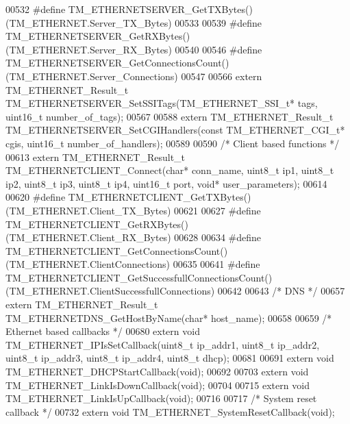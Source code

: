 \begin{DoxyCode}
00532 \textcolor{preprocessor}{#define TM\_ETHERNETSERVER\_GetTXBytes()          (TM\_ETHERNET.Server\_TX\_Bytes)}
00533 
00539 \textcolor{preprocessor}{#define TM\_ETHERNETSERVER\_GetRXBytes()          (TM\_ETHERNET.Server\_RX\_Bytes)}
00540 
00546 \textcolor{preprocessor}{#define TM\_ETHERNETSERVER\_GetConnectionsCount() (TM\_ETHERNET.Server\_Connections)}
00547 
00566 \textcolor{keyword}{extern} TM\_ETHERNET\_Result\_t TM\_ETHERNETSERVER\_SetSSITags(TM\_ETHERNET\_SSI\_t* tags, uint16\_t number\_of\_tags);
00567 
00588 \textcolor{keyword}{extern} TM\_ETHERNET\_Result\_t TM\_ETHERNETSERVER\_SetCGIHandlers(\textcolor{keyword}{const} TM\_ETHERNET\_CGI\_t* cgis, uint16\_t 
      number\_of\_handlers);
00589 
00590 \textcolor{comment}{/* Client based functions */}
00613 \textcolor{keyword}{extern} TM\_ETHERNET\_Result\_t TM\_ETHERNETCLIENT\_Connect(\textcolor{keywordtype}{char}* conn\_name, uint8\_t ip1, uint8\_t ip2, uint8\_t 
      ip3, uint8\_t ip4, uint16\_t port, \textcolor{keywordtype}{void}* user\_parameters);
00614 
00620 \textcolor{preprocessor}{#define TM\_ETHERNETCLIENT\_GetTXBytes()                      (TM\_ETHERNET.Client\_TX\_Bytes)}
00621 
00627 \textcolor{preprocessor}{#define TM\_ETHERNETCLIENT\_GetRXBytes()                      (TM\_ETHERNET.Client\_RX\_Bytes)}
00628 
00634 \textcolor{preprocessor}{#define TM\_ETHERNETCLIENT\_GetConnectionsCount()             (TM\_ETHERNET.ClientConnections)}
00635 
00641 \textcolor{preprocessor}{#define TM\_ETHERNETCLIENT\_GetSuccessfullConnectionsCount()  (TM\_ETHERNET.ClientSuccessfullConnections)}
00642 
00643 \textcolor{comment}{/* DNS */}
00657 \textcolor{keyword}{extern} TM\_ETHERNET\_Result\_t TM\_ETHERNETDNS\_GetHostByName(\textcolor{keywordtype}{char}* host\_name);
00658 
00659 \textcolor{comment}{/* Ethernet based callbacks */}
00680 \textcolor{keyword}{extern} \textcolor{keywordtype}{void} TM\_ETHERNET\_IPIsSetCallback(uint8\_t ip\_addr1, uint8\_t ip\_addr2, uint8\_t ip\_addr3, uint8\_t 
      ip\_addr4, uint8\_t dhcp);
00681 
00691 \textcolor{keyword}{extern} \textcolor{keywordtype}{void} TM\_ETHERNET\_DHCPStartCallback(\textcolor{keywordtype}{void});
00692 
00703 \textcolor{keyword}{extern} \textcolor{keywordtype}{void} TM\_ETHERNET\_LinkIsDownCallback(\textcolor{keywordtype}{void});
00704 
00715 \textcolor{keyword}{extern} \textcolor{keywordtype}{void} TM\_ETHERNET\_LinkIsUpCallback(\textcolor{keywordtype}{void});
00716 
00717 \textcolor{comment}{/* System reset callback */}
00732 \textcolor{keyword}{extern} \textcolor{keywordtype}{void} TM\_ETHERNET\_SystemResetCallback(\textcolor{keywordtype}{void});

\end{DoxyCode}
